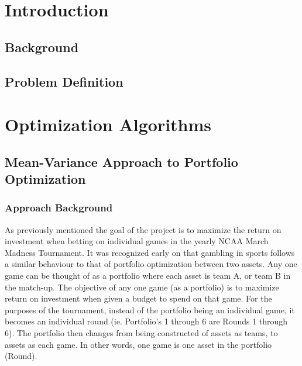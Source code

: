 \documentclass[12pt]{article}
\begin{document}


\dotableofcontents

\newpage
\doublespacing
{}
\section{Introduction}
\setlength{\parindent}{1cm}
\subsection{Background}

\subsection{Problem Definition}


\newpage
\section{Optimization Algorithms}
\subsection{Mean-Variance Approach to Portfolio Optimization}
\subsubsection{Approach Background}
As previously mentioned the goal of the project is to maximize the return on investment when betting on individual games in the yearly NCAA March Madness Tournament.
It was recognized early on that gambling in sports follows a similar behaviour to that of portfolio optimization between two assets. 
Any one game can be thought of as a portfolio where each asset is team A, or team B in the match-up.
The objective of any one game (as a portfolio) is to maximize return on investment when given a budget to spend on that game.
For the purposes of the tournament, instead of the portfolio being an individual game, it becomes an individual round (ie. Portfolio's 1 through 6 are Rounds 1 through 6).
The portfolio then changes from being constructed of assets as teams, to assets as each game.
In other words, one game is one asset in the portfolio (Round).
\end{document}
